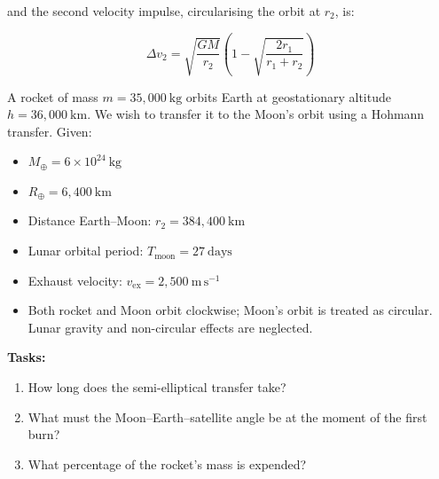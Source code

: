 \documentclass[10pt, a4paper]{article}
\begin{document}
and the second velocity impulse, circularising the orbit at $r_2$, is:

\begin{equation*}
    \Delta v_2 = \sqrt{\frac{GM}{r_2}}
    \left(1 - \sqrt{\frac{2r_1}{r_1 + r_2}}\right)
\end{equation*}
\begin{tcolorbox}[colback=blue!5!white, colframe=blue!75!black,
                  title={Example: Geostationary Orbit to the Moon}]

A rocket of mass $m = 35{,}000~\mathrm{kg}$ orbits Earth at geostationary
altitude $h = 36{,}000~\mathrm{km}$. We wish to transfer it to the Moon's
orbit using a Hohmann transfer. Given:

\begin{itemize}
    \item $M_\oplus = 6\times10^{24}~\mathrm{kg}$
    \item $R_\oplus = 6{,}400~\mathrm{km}$
    \item Distance Earth--Moon: $r_2 = 384{,}400~\mathrm{km}$
    \item Lunar orbital period: $T_\mathrm{moon} = 27~\mathrm{days}$
    \item Exhaust velocity: $v_\mathrm{ex} = 2{,}500~\mathrm{m\,s^{-1}}$
    \item Both rocket and Moon orbit clockwise; Moon's orbit is treated as
          circular. Lunar gravity and non-circular effects are neglected.
\end{itemize}

\textbf{Tasks:}
\begin{enumerate}[label=\alph*)]
    \item How long does the semi-elliptical transfer take?
    \item What must the Moon--Earth--satellite angle be at the moment of
          the first burn?
    \item What percentage of the rocket's mass is expended?
\end{enumerate}

\end{tcolorbox}
\end{document}
